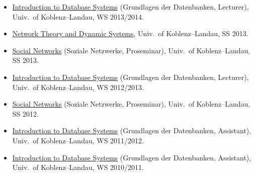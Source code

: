 \documentclass[line,margin]{res}
\begin{document}
\begin{resume}
\begin{itemize}
{    Theory and Dynamic Systems}, Univ.\ of Koblenz--Landau, SS 2014.
\item
  \href{http://west.uni-koblenz.de/teaching/ws1314/GdDB/GdDB}{Introduction
    to Database Systems} (Grundlagen der Datenbanken, 
  Lecturer), Univ.\ of Koblenz--Landau, WS 2013/2014.
\item 
  \href{https://west.uni-koblenz.de/teaching/ss13/network-theory-and-dynamic-systems}{Network
    Theory and Dynamic Systems}, Univ.\ of Koblenz--Landau, SS 2013.
\item
  \href{https://west.uni-koblenz.de/teaching/ss13/proseminar-soziale-netzwerke}{Social
  Networks} (Soziale Netzwerke, Proseminar), Univ.\ of Koblenz--Landau, SS 2013.
\item
  \href{https://www.uni-koblenz-landau.de/campus-koblenz/fb4/west/teaching/ws1213/datenbanken}{Introduction
    to Database Systems} (Grundlagen der Datenbanken, 
  Lecturer), Univ.\ of Koblenz--Landau, WS 2012/2013.
\item
  \href{https://www.uni-koblenz-landau.de/koblenz/fb4/AGStaab/Teaching/ss12/proseminar-soziale-netzwerke}{Social
  Networks} (Soziale Netzwerke, Proseminar), Univ.\ of Koblenz--Landau, SS 2012.
\item
  \href{http://www.uni-koblenz-landau.de/koblenz/fb4/AGStaab/Teaching/ws1112/Datenbanken}{Introduction
  to Database Systems} (Grundlagen der Datenbanken, Assistant), Univ.\ of
  Koblenz--Landau, WS 2011/2012. 
\item 
  \href{http://www.uni-koblenz-landau.de/koblenz/fb4/institute/IFI/AGStaab/Teaching/ws1011/Datenbanken/}{Introduction
  to Database Systems} (Grundlagen der Datenbanken, Assistant), Univ.\ of
  Koblenz--Landau, WS 2010/2011. 
\end{itemize}


\end{resume}
\end{document}
